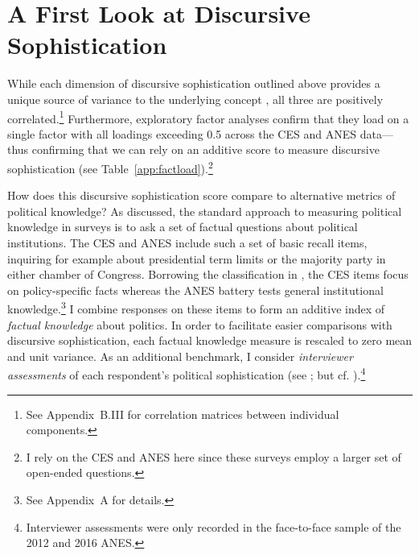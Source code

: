\section*{A First Look at Discursive Sophistication}

While each dimension of discursive sophistication outlined above provides a unique source of variance to the underlying concept \citep{luskin1987measuring}, all three are positively correlated.\footnote{See Appendix~B.III for correlation matrices between individual components.} Furthermore, exploratory factor analyses confirm that they load on a single factor with all loadings exceeding 0.5 across the CES and ANES data---thus confirming that we can rely on an additive score to measure discursive sophistication (see Table~\ref{app:factload}).\footnote{I rely on the CES and ANES here since these surveys employ a larger set of open-ended questions.}



How does this discursive sophistication score compare to alternative metrics of political knowledge? As discussed, the standard approach to measuring political knowledge in surveys is to ask a set of factual questions about political institutions. The CES and ANES include such a set of basic recall items, inquiring for example about presidential term limits or the majority party in either chamber of Congress. Borrowing the classification in \citet{barabas2014question}, the CES items focus on policy-specific facts whereas the ANES battery tests general institutional knowledge.\footnote{See Appendix~A for details.} I combine responses on these items to form an additive index of \textit{factual knowledge} about politics. In order to facilitate easier comparisons with discursive sophistication, each factual knowledge measure is rescaled to zero mean and unit variance. As an additional benchmark, I consider \textit{interviewer assessments} of each respondent's political sophistication (see \citealt{bartels2005homer}; but cf. \citealt{ryan2011accuracy}).\footnote{Interviewer assessments were only recorded in the face-to-face sample of the 2012 and 2016 ANES.}


